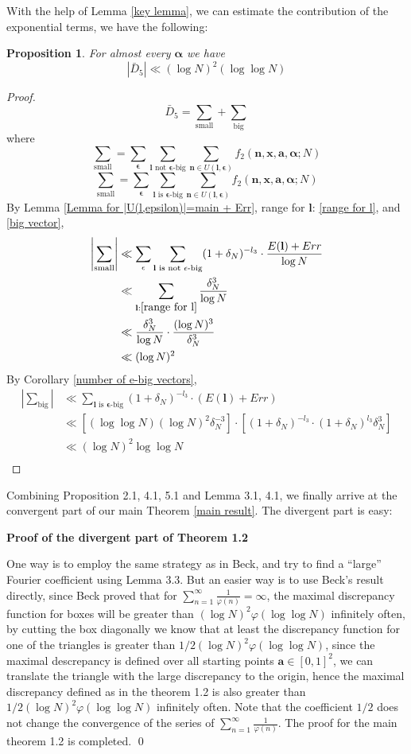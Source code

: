 \documentclass[11pt]{article}
\newtheorem{Prop}{Proposition}[section]
\newcommand{\beq}{\begin{equation}}
\newcommand{\eeq}{\end{equation}}
\newcommand{\fc}{\frac}
\newcommand{\nid}{\noindent}
\renewcommand{\l}{\left}
\renewcommand{\r}{\right}
\renewcommand{\a}{\alpha}
\newcommand{\e}{\epsilon}
\renewcommand{\(}{\left(}
\renewcommand{\)}{\right)}
\renewcommand{\bf}{\mathbf}
\renewcommand{\d}{\delta}
\newcommand{\bal}{\begin{aligned}}
\newcommand{\eal}{\end{aligned}}
\newcommand{\bma}{\bm{\alpha}}
\newcommand{\ftwo}{f_2(\bf{n},\bf{x},\bm{a},\bm{\a};N)}
\newcommand{\<}{\langle}
\renewcommand{\>}{\rangle}
\begin{document}
With the help of Lemma \ref{key lemma}, we can estimate the contribution of the exponential terms, we have the following:
\begin{Prop}\label{Estimation of the exponential terms}
For almost every $\bma$ we have 
$$
\l|\bar{D}_5\r|\ll (\log N)^2(\log \log N)
$$
\end{Prop}
\begin{proof}
$$
\bar{D}_5=\sum_{\text{small}}+\sum_{\text{big}}
$$
where 
\beq\label{small sum}
\sum_{\text{small}}=\sum_{\bf{\e}}\sum_{\text{$\bf{l}$ not $\bf{\e}$-big}}\sum_{\bf{n}\in U(\bf{l},\bf{\e})}   \ftwo
\eeq
\beq\label{big sum}
\sum_{\text{small}}=\sum_{\bf{\e}}\sum_{\text{$\bf{l}$ is $\bf{\e}$-big}}\sum_{\bf{n}\in U(\bf{l},\bf{\e})}   \ftwo
\eeq
By Lemma \ref{Lemma for |U(l,epsilon)|=main + Err}, range for $\bf{l}$: \eqref{range for l}, and \eqref{big vector},
$$
\bal
\l|\sum_{\text{small}}\r|&\ll \sum_{\bf{\e}}\sum_{\bf{l}\text{ is not $\bf{\e}$-big}} (1+\d_N)^{-l_3}\cdot\fc{ E(\bf{l})+Err}{\log N}\\
&\ll\sum_{\bf{l}:\eqref{range for l}}\fc{\d_N^3}{\log N}\\
&\ll \fc{\d_N^3}{\log N} \cdot \fc{(\log N)^3}{\d_N^3}\\
&\ll (\log N)^2\\
\eal
$$
By Corollary \ref{number of e-big vectors},
$$
\bal
|\sum_{\text{big}}|&\ll \sum_{\text{$\bf{l}$ is $\bm{\e}$-big}} (1+\d_N)^{-l_3}\cdot (E(\bf{l})+Err)\\
&\ll[(\log \log N)(\log N)^2\d_N^{-3}]\cdot[(1+\d_N)^{-l_3}\cdot (1+\d_N)^{l_3}\d_N^3]\\
&\ll(\log N)^2\log \log N\\
\eal
$$
\end{proof}
Combining Proposition 2.1, 4.1, 5.1 and Lemma 3.1, 4.1, we finally arrive at the convergent part of our main Theorem \ref{main result}. The divergent part is easy:

\nid\textbf{Proof of the divergent part of Theorem 1.2}

One way is to employ the same strategy as in Beck\cite{Beck}, and try to find a ``large'' Fourier coefficient using Lemma 3.3. But an easier way is to use Beck's result directly, since Beck proved that for $\sum_{n=1}^{\infty}\fc{1}{\varphi(n)}=\infty$, the maximal discrepancy function for boxes will be greater than $(\log N)^2\varphi(\log \log N)$ infinitely often, by cutting the box diagonally we know that at least the discrepancy function for one of the triangles is greater than $1/2(\log N)^2\varphi(\log \log N)$, since the maximal descrepancy is defined over all starting points $\bm{a}\in [0,1]^2$, we can translate the triangle with the large discrepancy to the origin, hence the maximal discrepancy defined as in the theorem 1.2 is also greater than $1/2(\log N)^2\varphi(\log \log N)$ infinitely often. Note that the coefficient $1/2$ does not change the convergence of the series of $\sum_{n=1}^{\infty}\fc{1}{\varphi(n)}$. The proof for the main theorem 1.2 is completed. \qed

\clearpage

\newpage 


\end{document}
